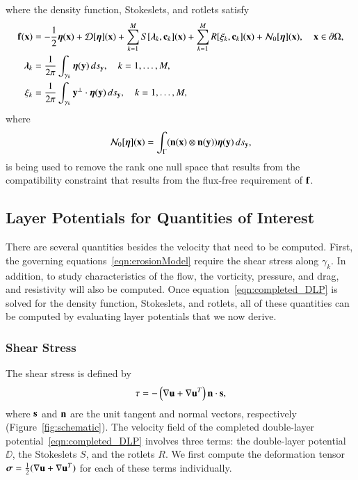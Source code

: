 \documentclass[preprint, 10pt]{elsarticle}
\begin{document}
where the density function, Stokeslets, and rotlets satisfy
\begin{subequations}
\label{eqn:completed_BIE}
\begin{align}
  \ff(\xx) &= -\frac{1}{2}\eeta(\xx) + \DD[\eeta](\xx) + 
      \sum_{k=1}^{M} S[\llambda_k,\cc_k](\xx) +
      \sum_{k=1}^{M} R[\xi_k,\cc_k](\xx) + \NN_0[\eeta](\xx),
      \quad \xx \in \bd\Omega, 
      \label{eqn:DLP}\\
  \llambda_k &= \frac{1}{2\pi}\int_{\gamma_k} \eeta(\yy) \, ds_\yy,
  \quad k=1,\ldots,M,
  \label{eqn:stokeslet} \\
  \xi_k &= \frac{1}{2\pi}\int_{\gamma_k} \yy^\perp \cdot \eeta(\yy)
  \, ds_\yy, \quad k=1,\ldots,M,
  \label{eqn:rotlet}
\end{align}
\end{subequations}
where 
\begin{align*}
  \NN_0[\eeta](\xx) = \int_{\Gamma} 
    (\nn(\xx) \otimes \nn(\yy))\eeta(\yy) \, ds_\yy,
\end{align*}
is being used to remove the rank one null space that results from the
compatibility constraint that results from the flux-free requirement of
$\ff$.



\subsection{Layer Potentials for Quantities of Interest}
\label{sec:qois}
There are several quantities besides the velocity that need to be
computed.  First, the governing equations~\eqref{eqn:erosionModel}
require the shear stress along $\gamma_k$.  In addition, to study
characteristics of the flow, the vorticity, pressure, and drag, and
resistivity will also be computed.  Once
equation~\eqref{eqn:completed_DLP} is solved for the density function,
Stokeslets, and rotlets, all of these quantities can be computed by
evaluating layer potentials that we now derive.

\subsubsection{Shear Stress}
The shear stress is defined by
\begin{align*}
  \tau = -\left(\nabla \uu + \nabla \uu^T \right)\nn \cdot \ss,
\end{align*}
where $\ss$ and $\nn$ are the unit tangent and normal vectors,
respectively (Figure~\ref{fig:schematic}).  The velocity field of the
completed double-layer potential~\eqref{eqn:completed_DLP} involves
three terms: the double-layer potential $\DD$, the Stokeslets $S$, and
the rotlets $R$.  We first compute the deformation tensor $\ssigma =
\frac{1}{2}(\nabla\uu + \nabla\uu^T)$ for each of these terms
individually.
\end{document}
